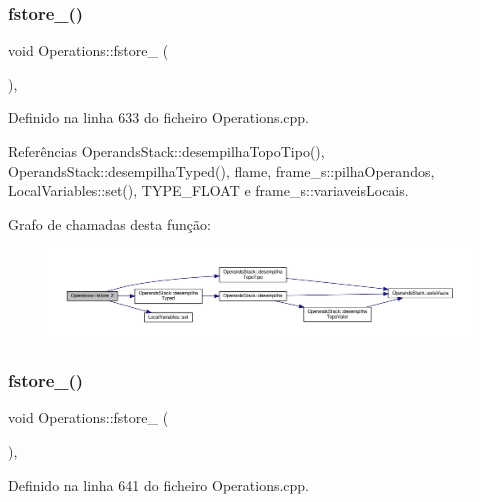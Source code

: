 \subsubsection{\texorpdfstring{fstore\+\_()}{fstore\_2()}}
{\footnotesize\ttfamily void Operations\+::fstore\+\_ (\begin{DoxyParamCaption}{ }\end{DoxyParamCaption})\hspace{0.3cm}{\ttfamily [static]}, {\ttfamily [private]}}



Definido na linha 633 do ficheiro Operations.\+cpp.



Referências Operands\+Stack\+::desempilha\+Topo\+Tipo(), Operands\+Stack\+::desempilha\+Typed(), flame, frame\+\_\+s\+::pilha\+Operandos, Local\+Variables\+::set(), T\+Y\+P\+E\+\_\+\+F\+L\+O\+AT e frame\+\_\+s\+::variaveis\+Locais.

Grafo de chamadas desta função\+:
\nopagebreak
\begin{figure}[H]
\begin{center}
\leavevmode
\includegraphics[width=350pt]{classOperations_a6d0a2faa9f164d49accf491a95364e2f_cgraph}
\end{center}
\end{figure}
\mbox{\label{classOperations_a00786621697e0e6e6c084c3cee1599ae}} 
\subsubsection{\texorpdfstring{fstore\+\_()}{fstore\_3()}}
{\footnotesize\ttfamily void Operations\+::fstore\+\_ (\begin{DoxyParamCaption}{ }\end{DoxyParamCaption})\hspace{0.3cm}{\ttfamily [static]}, {\ttfamily [private]}}



Definido na linha 641 do ficheiro Operations.\+cpp.



